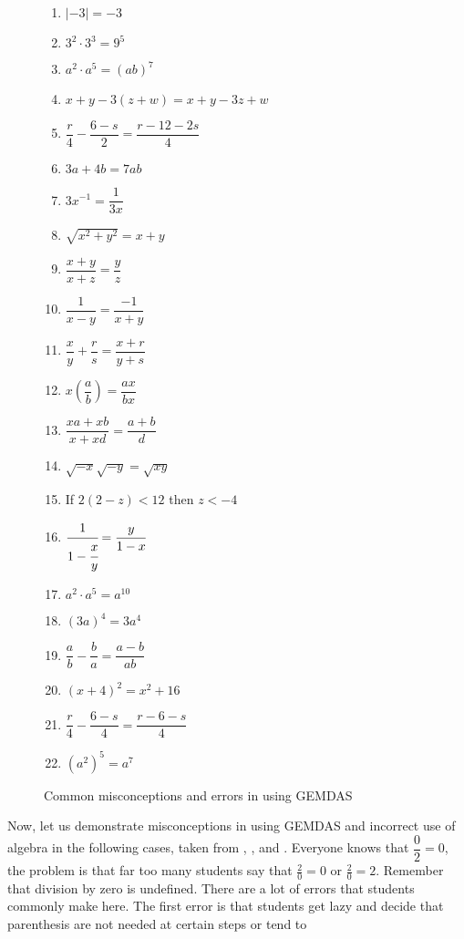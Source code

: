 \begin{figure}[!h]
\centering
\caption{Common misconceptions and errors in using GEMDAS}
\begin{multicols}{2}
\begin{enumerate}
\item $|-3|=-3$
\item $3^2\cdot 3^3=9^5$
\item $a^2\cdot a^5=(ab)^7$
\item $x+y-3(z+w)=x+y-3z+w$
\item $\dfrac{r}{4}-\dfrac{6-s}{2}=\dfrac{r-12-2s}{4}$
\item $3a+4b=7ab$
\item $3x^{-1}=\dfrac{1}{3x}$
\item $\sqrt{x^2+y^2}=x+y$
\item $\dfrac{x+y}{x+z}=\dfrac{y}{z}$
\item $\dfrac{1}{x-y}=\dfrac{-1}{x+y}$
\item $\dfrac{x}{y}+\dfrac{r}{s}=\dfrac{x+r}{y+s}$
\item $x\left(\dfrac{a}{b}\right)=\dfrac{ax}{bx}$
\item $\dfrac{xa+xb}{x+xd}=\dfrac{a+b}{d}$
\item $\sqrt{-x}\sqrt{-y}=\sqrt{xy}$
\item If $2(2-z)<12$ then $z<-4$
\item $\cfrac{1}{1-\cfrac{x}{y}}=\dfrac{y}{1-x}$
\item $a^2\cdot a^5=a^{10}$
\item $(3a)^4=3a^4$
\item $\dfrac{a}{b}-\dfrac{b}{a}=\dfrac{a-b}{ab}$
\item $(x+4)^2=x^2+16$
\item $\dfrac{r}{4}-\dfrac{6-s}{4}=\dfrac{r-6-s}{4}$
\item $(a^2)^5=a^7$
\end{enumerate}
\end{multicols}
\label{chap4fig:1}
\end{figure}
Now, let us demonstrate misconceptions in using GEMDAS and incorrect use of algebra in the
following cases, taken from \textcite{larson}, \textcite{common}, \textcite{dawkins2} and \textcite{merlin}.
 Everyone knows that $\dfrac{0}{2}=0$, the problem is that far too many students say that
$\frac{2}{0}=0$ or $\frac{2}{0}=2$. Remember that division by zero is undefined.
 There are a lot of errors that students commonly make here. The first error is that
students get lazy and decide that parenthesis are not needed at certain steps or tend to
